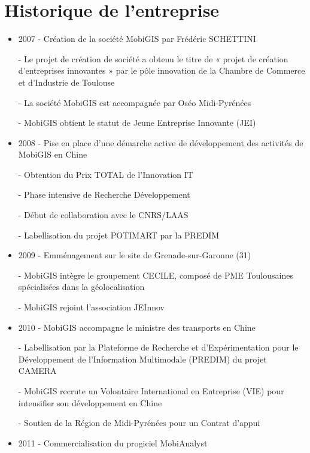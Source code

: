 \section{Historique de l'entreprise}
\renewcommand{\labelitemi}{\textbullet}
\begin{itemize}
\item 2007 
    - Création de la société MobiGIS par Frédéric SCHETTINI 
		
    - Le projet de création de société a obtenu le titre de « projet de création d’entreprises innovantes » par le pôle innovation de la Chambre de Commerce et d’Industrie de Toulouse 
		
    - La société MobiGIS est accompagnée par Oséo Midi-Pyrénées 
    
		- MobiGIS obtient le statut de Jeune Entreprise Innovante (JEI) 
\\
\item 2008 
    - Pise en place d’une démarche active de développement des activités de MobiGIS en Chine 
    
		- Obtention du Prix TOTAL de l’Innovation IT 
    
		- Phase intensive de Recherche Développement 
    
		- Début de collaboration avec le CNRS/LAAS 
    
		- Labellisation du projet POTIMART par la PREDIM 
\\
\item 2009 
    - Emménagement sur le site de Grenade-sur-Garonne (31) 
    
		- MobiGIS intègre le groupement CECILE, composé de PME Toulousaines spécialisées dans la géolocalisation 
    
		- MobiGIS rejoint l’association JEInnov 
\\
\item 2010 
    - MobiGIS accompagne le ministre des transports en Chine 
    
		- Labellisation par la Plateforme de Recherche et d’Expérimentation pour le Développement de l’Information Multimodale (PREDIM) du projet CAMERA 
    
		- MobiGIS recrute un Volontaire International en Entreprise (VIE) pour intensifier son développement en Chine 
    
		- Soutien de la Région de Midi-Pyrénées pour un Contrat d’appui 
\\
\item 2011 
    - Commercialisation du progiciel MobiAnalyst 
    

\end{itemize}
